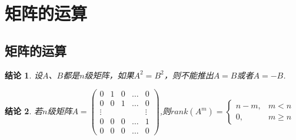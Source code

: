 \documentclass[UTF8]{article}
\newtheorem{ccl}{结论}[subsection]
\begin{document}
\section{矩阵的运算}
\subsection{矩阵的运算}
\begin{ccl}
  设$A$、$B$都是$n$级矩阵，如果$A^2=B^2$，则不能推出$A=B$或者$A=-B$.
\end{ccl}
\begin{ccl}
  若$n$级矩阵$A=\begin{pmatrix} 0 & 1 & 0 & \ldots & 0\\ 0 & 0 & 1 & \ldots & 0\\
  \vdots & & & & \vdots \\0 & 0 & 0 & \ldots & 1\\ 0 & 0 & 0 & \ldots & 0 \end{pmatrix}$,则$rank(A^m)=\begin{cases} n-m,&m<n\\0,& m\ge n\end{cases}$
\end{ccl}
\end{document}
